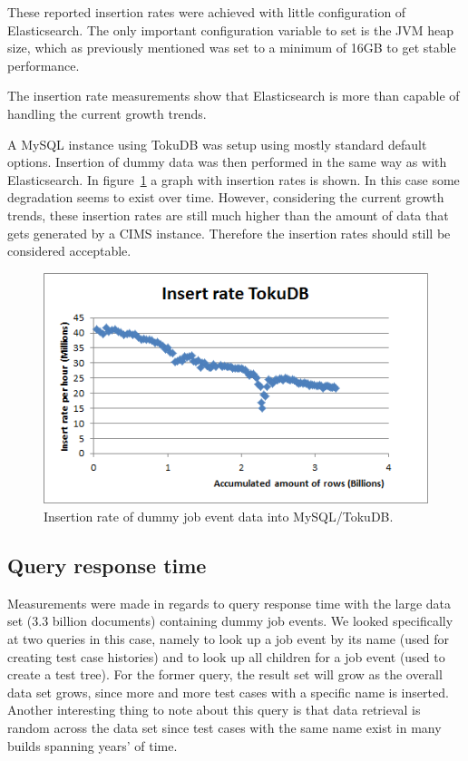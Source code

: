 These reported insertion rates were achieved with little configuration of Elasticsearch. The only important configuration variable to set is the JVM heap size, which as previously mentioned was set to a minimum of 16GB to get stable performance.

The insertion rate measurements show that Elasticsearch is more than capable of handling the current growth trends.


A MySQL instance using TokuDB was setup using mostly standard default options. Insertion of dummy data was then performed in the same way as with Elasticsearch. In figure~\ref{fig:insert_rate_tokudb} a graph with insertion rates is shown. In this case some degradation seems to exist over time. However, considering the current growth trends, these insertion rates are still much higher than the amount of data that gets generated by a CIMS instance. Therefore the insertion rates should still be considered acceptable.
\begin{figure}[h!]
\centering
\includegraphics[]{figure/insert_rate_tokudb.png}
\caption{Insertion rate of dummy job event data into MySQL/TokuDB.}
\label{fig:insert_rate_tokudb}
\end{figure}

\subsection{Query response time}
Measurements were made in regards to query response time with the large data set (3.3 billion documents) containing dummy job events. We looked specifically at two queries in this case, namely to look up a job event by its name (used for creating test case histories) and to look up all children for a job event (used to create a test tree). For the former query, the result set will grow as the overall data set grows, since more and more test cases with a specific name is inserted. Another interesting thing to note about this query is that data retrieval is random across the data set since test cases with the same name exist in many builds spanning years' of time.

